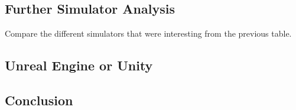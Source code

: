 \subsection{Further Simulator Analysis}
Compare the different simulators that were interesting from the previous table.


\subsection{Unreal Engine or Unity}
\subsection{Conclusion}

